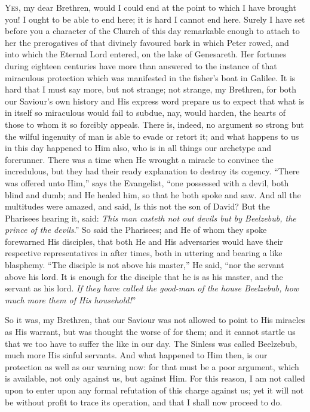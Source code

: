 Y\textsc{es}, my dear Brethren, would I could end at the
point to which I have brought you! I ought to be able to
end here; it is hard I cannot end here. Surely I have set
before you a character of the Church of this day
remarkable enough to attach to her the prerogatives of
that divinely favoured bark in which Peter rowed, and
into which the Eternal Lord entered, on the lake of
Genesareth. Her fortunes during eighteen centuries have
more than answered to the instance of that miraculous
protection which was manifested in the fisher's boat in
Galilee. It is hard that I must say more, but not
strange; not strange, my Brethren, for both our Saviour's
own history and His express word prepare us to expect
that what is in itself so miraculous would fail to
subdue, nay, would harden, the hearts of those to whom it
so forcibly appeals. There is, indeed, no argument so
strong but the wilful ingenuity of man is able to evade
or retort it; and what happens to us in this day happened
to Him also, who is in all things our archetype and
forerunner. There was a time when He wrought a miracle to
convince the incredulous, but they had their ready
explanation to destroy its cogency. ``There was
offered unto Him,'' says the Evangelist, ``one
possessed with a devil, both blind and dumb; and He
healed him, so that he both spoke and saw. And all the
multitudes were amazed, and said, Is this not the son of
David? But the Pharisees hearing it, said: \emph{This man
casteth not out devils but by Beelzebub, the prince of
the devils}.'' So said the Pharisees; and He of
whom they spoke forewarned His disciples, that both He
and His adversaries would have their respective
representatives in after times, both in uttering and
bearing a like blasphemy. ``The disciple is not above
his master,'' He said, ``nor the servant above
his lord. It is enough for the disciple that he is as his
master, and the servant as his lord. \emph{If they have
called the good-man of the house Beelzebub, how much more
them of His household!}''

So it was, my Brethren, that our Saviour was not
allowed to point to His miracles as His warrant, but was
thought the worse of for them; and it cannot startle us
that we too have to suffer the like in our day. The
Sinless was called Beelzebub, much more His sinful
servants. And what happened to Him then, is our
protection as well as our warning now: for that must be a
poor argument, which is available, not only against us,
but against Him. For this reason, I am not called upon to
enter upon any formal refutation of this charge against
us; yet it will not be without profit to trace its
operation, and that I shall now proceed to do.


